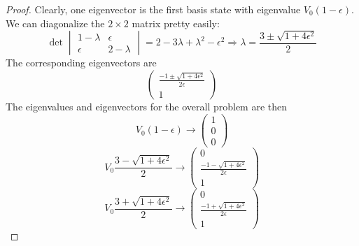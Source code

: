 \documentclass{article}
\begin{document}
\begin{proof}
  Clearly, one eigenvector is the first basis state with eigenvalue $V_{0}(1 - \epsilon)$.
  We can diagonalize the $2 \times 2$ matrix pretty easily:
  \[
    \det
    \begin{vmatrix}
      1 - \lambda & \epsilon \\
      \epsilon & 2 - \lambda
    \end{vmatrix}
    = 2 - 3\lambda + \lambda^{2} - \epsilon^{2}
    \Rightarrow \lambda = \frac{3 \pm \sqrt{1 + 4\epsilon^{2}}}{2}
  \]
  The corresponding eigenvectors are
  \[
    \begin{pmatrix}
      \frac{-1 \pm \sqrt{1 + 4\epsilon^{2}}}{2\epsilon} \\
      1
    \end{pmatrix}
  \]
  The eigenvalues and eigenvectors for the overall problem are then
  \[
    V_{0}(1 - \epsilon) \to
    \begin{pmatrix}
      1 \\
      0 \\
      0
    \end{pmatrix}
  \]
  \[
    V_{0}\frac{3 - \sqrt{1 + 4\epsilon^{2}}}{2} \to
    \begin{pmatrix}
      0 \\
      \frac{-1 - \sqrt{1 + 4\epsilon^{2}}}{2\epsilon} \\
      1
    \end{pmatrix}
  \]
  \[
    V_{0}\frac{3 + \sqrt{1 + 4\epsilon^{2}}}{2} \to
    \begin{pmatrix}
      0 \\
      \frac{-1 + \sqrt{1 + 4\epsilon^{2}}}{2\epsilon} \\
      1
    \end{pmatrix}
  \]


\end{proof}
\end{document}
